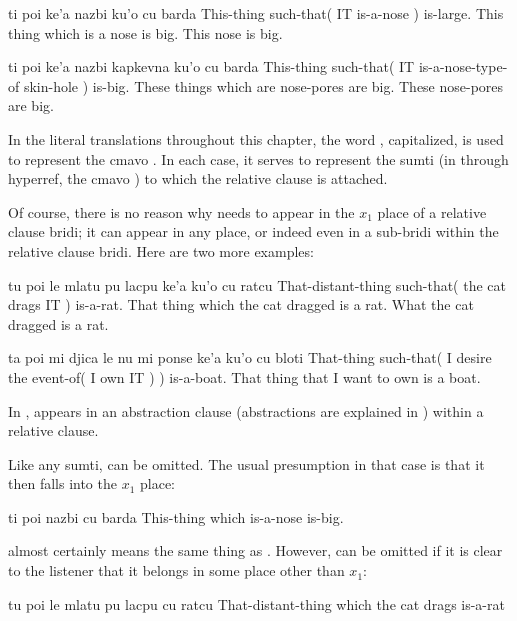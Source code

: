 \begin{example}
ti poi ke'a nazbi ku'o cu barda\n
This-thing such-that( IT is-a-nose ) is-large.\n
This thing which is a nose is big.\n
This nose is big.
\end{example}

\begin{example}
ti poi ke'a nazbi kapkevna ku'o\n
\T	cu barda\n
This-thing such-that( IT is-a-nose-type-of skin-hole )\n
\T	is-big.\n
These things which are nose-pores are big.\n
These nose-pores are big.
\end{example}

In the literal translations throughout this chapter, the word
    , capitalized, is used to represent the cmavo .
    In each case, it serves to represent the sumti (in  through hyperref, the cmavo ) to which the relative
    clause is attached. 

Of course, there is no reason why  needs to appear
    in the $x_1$ place of a relative clause bridi; it can appear in
    any place, or indeed even in a sub-bridi within the relative
    clause bridi. Here are two more examples:
\begin{example}
tu poi le mlatu pu lacpu ke'a ku'o\n
\T	cu ratcu\n
That-distant-thing such-that( the cat  drags IT )\n
\T	is-a-rat.\n
That thing which the cat dragged is a rat.\n
What the cat dragged is a rat.
\end{example}

\begin{example}
ta poi mi djica le nu mi ponse ke'a  ku'o\n
\T	cu bloti\n
That-thing such-that( I desire the event-of( I own IT ) )\n
\T	is-a-boat.\n
That thing that I want to own is a boat.
\end{example}

In ,  appears in an
    abstraction clause (abstractions are explained in ) within a relative
    clause.

Like any sumti,  can be omitted. The usual
    presumption in that case is that it then falls into the $x_1$
    place:
\begin{example}
ti poi nazbi cu barda\n
This-thing which is-a-nose is-big.
\end{example}

{\noindent}almost certainly means the same thing as . However,  can be omitted
    if it is clear to the listener that it belongs in some place
    other than $x_1$:
\begin{example}
tu poi le mlatu pu lacpu cu ratcu\n
That-distant-thing which the cat drags is-a-rat
\end{example}

